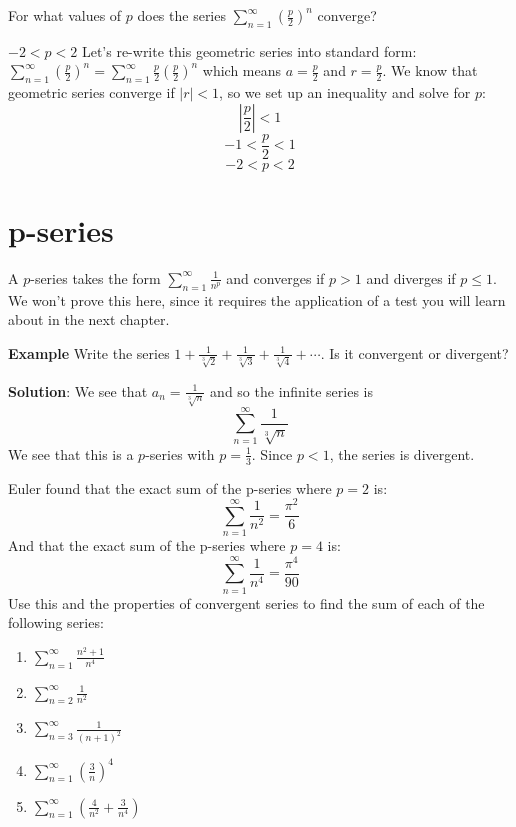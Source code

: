 \begin{Exercise}[label = geo3]
For what values of $p$ does the series $\sum_{n = 1}^\infty \left( \frac{p}{2} 
\right) ^ n$ converge?
\end{Exercise}

\begin{Answer}[ref = geo3]
$-2 < p < 2$ Let's re-write this geometric series into standard form: $\sum_{n 
= 1}^\infty \left( \frac{p}{2} \right) ^ n = \sum_{n = 1}^\infty \frac{p}{2} 
\left( \frac{p}{2} \right) ^ n$ which means $a = \frac{p}{2}$ and $r = 
\frac{p}{2}$. We know that geometric series converge if $\left| r \right| < 
1$, so we set up an inequality and solve for $p$:
$$\left| \frac{p}{2} \right| < 1$$
$$-1 < \frac{p}{2} < 1$$
$$-2 < p < 2$$
\end{Answer}

\section{p-series}
A $p$-series takes the form $\sum_{n=1}^\infty \frac{1}{n^p}$ and converges 
if $p > 1$ and diverges if $p \leq 1$. We won't prove this here, since it 
requires the application of a test you will learn about in the next chapter. 

\textbf{Example} Write the series $1 + \frac{1}{\sqrt[3]{2}} + \frac{1}{
\sqrt[3]{3}} + \frac{1}{\sqrt[3]{4}} + \cdots$. Is it convergent or divergent?

\textbf{Solution}: We see that $a_n = \frac{1}{\sqrt[3]{n}}$ and so the 
infinite series is $$\sum_{n=1}^\infty \frac{1}{\sqrt[3]{n}}$$ 
We see that this is a $p$-series with $p = \frac{1}{3}$. Since $p < 1$, the 
series is divergent. 

\begin{Exercise}[label = euler1]
Euler found that the exact sum of the p-series where $p=2$ is:
$$\sum_{n=1}^\infty \frac{1}{n^2} = \frac{\pi^2}{6}$$
And that the exact sum of the p-series where $p=4$ is:
$$\sum_{n=1}^\infty \frac{1}{n^4} = \frac{\pi^4}{90}$$
Use this and the properties of convergent series to find the sum of each of 
the following series:
\begin{enumerate}
\item $\sum_{n=1}^\infty \frac{n^2 + 1}{n^4}$
\item $\sum_{n=2}^\infty \frac{1}{n^2}$
\item $\sum_{n=3}^\infty \frac{1}{(n + 1)^2}$
\item $\sum_{n=1}^\infty \left( \frac{3}{n} \right)^4$
\item $\sum_{n=1}^\infty \left( \frac{4}{n^2} + \frac{3}{n^4} \right)$
\end{enumerate}
\vspace{50mm}
\end{Exercise}

